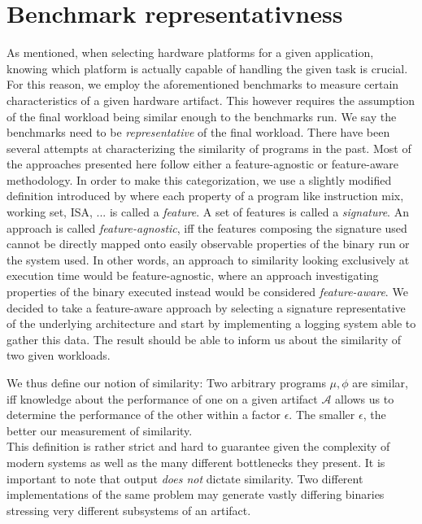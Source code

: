 \documentclass[../bachelor_paper.tex]{subfiles}
\begin{document}
\section{Benchmark representativness}
    \label{sec:prob/repr}
As mentioned, when selecting hardware platforms for a given application, knowing which platform is actually capable of handling the given task is crucial. For this reason, we employ the aforementioned benchmarks to measure certain characteristics of a given hardware artifact. This however requires the assumption of the final workload being similar enough to the benchmarks run. We say the benchmarks need to be \emph{representative} of the final workload. There have been several attempts at characterizing the similarity of programs in the past. Most of the approaches presented here follow either a feature-agnostic or feature-aware methodology. In order to make this categorization, we use a slightly modified definition introduced by \cite{cammarotaOptimizingProgramPerformance2013} where each property of a program like instruction mix, working set, \ac{ISA}, ... is called a \emph{feature}. A set of features is called a \emph{signature}. An approach is called \emph{feature-agnostic}, iff the features composing the signature used cannot be directly mapped onto easily observable properties of the binary run or the system used. In other words, an approach to similarity looking exclusively at execution time would be feature-agnostic, where an approach investigating properties of the binary executed instead would be considered \emph{feature-aware}. We decided to take a feature-aware approach by selecting a signature representative of the underlying architecture and start by implementing a logging system able to gather this data. The result should be able to inform us about the similarity of two given workloads.

We thus define our notion of similarity: Two arbitrary programs $\mu, \phi$ are similar, iff knowledge about the performance of one on a given artifact $\mathcal{A}$ allows us to determine the performance of the other within a factor $\epsilon$. The smaller $\epsilon$, the better our measurement of similarity. \\
This definition is rather strict and hard to guarantee given the complexity of modern systems as well as the many different bottlenecks they present. It is important to note that output \emph{does not} dictate similarity. Two different implementations of the same problem may generate vastly differing binaries stressing very different subsystems of an artifact.
\end{document}
